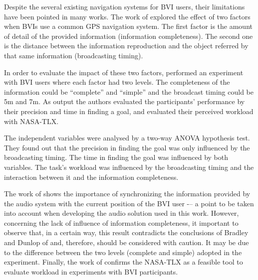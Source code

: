 Despite the several existing navigation systems for BVI users, their limitations have been pointed in many works. The work of  explored the effect of two factors when BVIs use a common GPS navigation system. The first factor is the amount of detail of the provided information (information completeness). The second one is the distance between the information reproduction and the object referred by that same information (broadcasting timing).

In order to evaluate the impact of these two factors,  performed an experiment with BVI users where each factor had two levels. The completeness of the information could be “complete” and “simple” and the broadcast timing could be 5m and 7m. As output the authors evaluated the participants’ performance by their precision and time in finding a goal, and evaluated their perceived workload with NASA-TLX. 

The independent variables were analysed by a two-way ANOVA hypothesis test. They found out that the precision in finding the goal was only influenced by the broadcasting timing. The time in finding the goal was influenced by both variables. The task’s workload was influenced by the broadcasting timing and the interaction between it and the information completeness.

The work of  shows the importance of synchronizing the information provided by the audio system with the current position of the BVI user -– a point to be taken into account when developing the audio solution used in this work. However, concerning the lack of influence of information completeness, it important to observe that, in a certain way, this result contradicts the conclusions of Bradley and Dunlop of \citeyear{bradley2002investigating,bradley2005experimental} and, therefore, should be considered with caution. It may be due to the difference between the two levels (complete and simple) adopted in the experiment. Finally, the work of  confirms the NASA-TLX as a feasible tool to evaluate workload in experiments with BVI participants.
